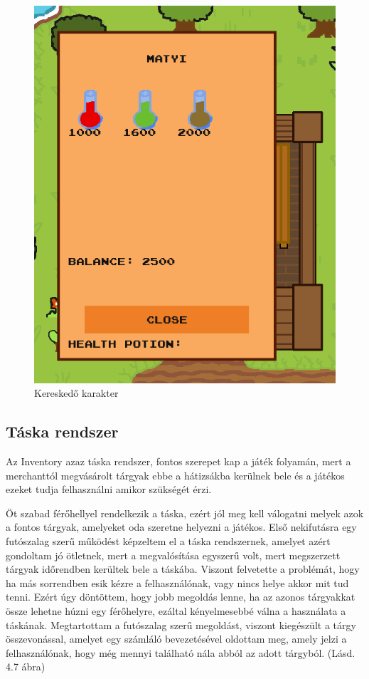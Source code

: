 \begin{figure}[H]
    \centering
    \includegraphics[width=9.0truecm]{images/merchant.png}
    \caption{Kereskedő karakter \cite{Merchant}}
    \label{fig:Merchant}
\end{figure}


\subsection{Táska rendszer}

\indent \indent Az Inventory azaz táska rendszer, fontos szerepet kap a játék folyamán, mert a merchanttól megvásárolt tárgyak ebbe a hátizsákba kerülnek bele és a játékos ezeket tudja felhasználni amikor szükségét érzi.

Öt szabad férőhellyel rendelkezik a táska, ezért jól meg kell válogatni melyek azok a fontos tárgyak, amelyeket oda szeretne helyezni a játékos. Első nekifutásra egy futószalag szerű működést képzeltem el a táska rendszernek, amelyet azért gondoltam jó ötletnek, mert a megvalósítása egyszerű volt, mert megszerzett tárgyak időrendben kerültek bele a táskába. Viszont felvetette a problémát, hogy ha más sorrendben esik kézre a felhasználónak, vagy nincs helye akkor mit tud tenni. Ezért úgy döntöttem, hogy jobb megoldás lenne, ha az azonos tárgyakkat össze lehetne húzni egy férőhelyre, ezáltal kényelmesebbé válna a használata a táskának. Megtartottam a futószalag szerű megoldást, viszont kiegészült a tárgy összevonással, amelyet egy számláló bevezetésével oldottam meg, amely jelzi a felhasználónak, hogy még mennyi található nála abból az adott tárgyból. (Lásd. 4.7 ábra)

